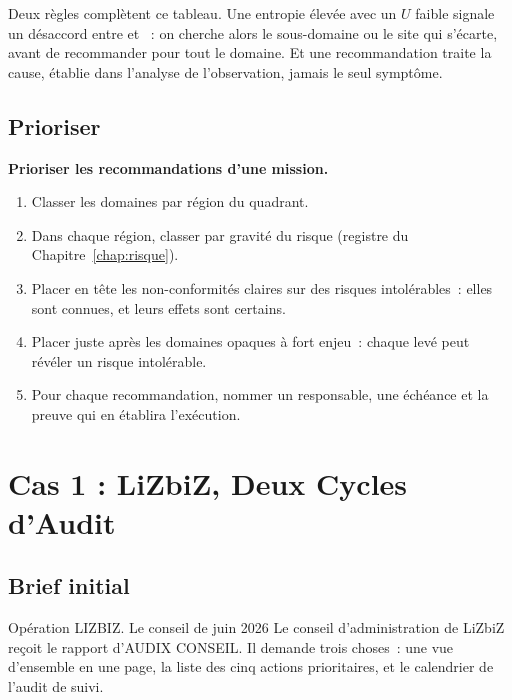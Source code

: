 Deux règles complètent ce tableau. Une entropie élevée avec un $U$ faible
signale un désaccord entre \OUI{} et \NON{}~: on cherche alors le
sous-domaine ou le site qui s'écarte, avant de recommander pour tout le
domaine. Et une recommandation traite la cause, établie dans l'analyse de
l'observation, jamais le seul symptôme.

\subsection{Prioriser}

\begin{boxprocedure}
\textbf{Prioriser les recommandations d'une mission.}
\begin{enumerate}
    \item Classer les domaines par région du quadrant.
    \item Dans chaque région, classer par gravité du risque (registre du
          Chapitre~\ref{chap:risque}).
    \item Placer en tête les non-conformités claires sur des risques
          intolérables~: elles sont connues, et leurs effets sont
          certains.
    \item Placer juste après les domaines opaques à fort enjeu~: chaque
          \NEK{} levé peut révéler un risque intolérable.
    \item Pour chaque recommandation, nommer un responsable, une échéance
          et la preuve qui en établira l'exécution.
\end{enumerate}
\end{boxprocedure}

\section{Cas 1 : LiZbiZ, Deux Cycles d'Audit}
\label{sec:c18-lizbiz}

\subsection{Brief initial}

\begin{boxscenario}{Opération LIZBIZ. Le conseil de juin 2026}
Le conseil d'administration de LiZbiZ reçoit le rapport d'AUDIX CONSEIL. Il
demande trois choses~: une vue d'ensemble en une page, la liste des cinq
actions prioritaires, et le calendrier de l'audit de suivi.
\end{boxscenario}

